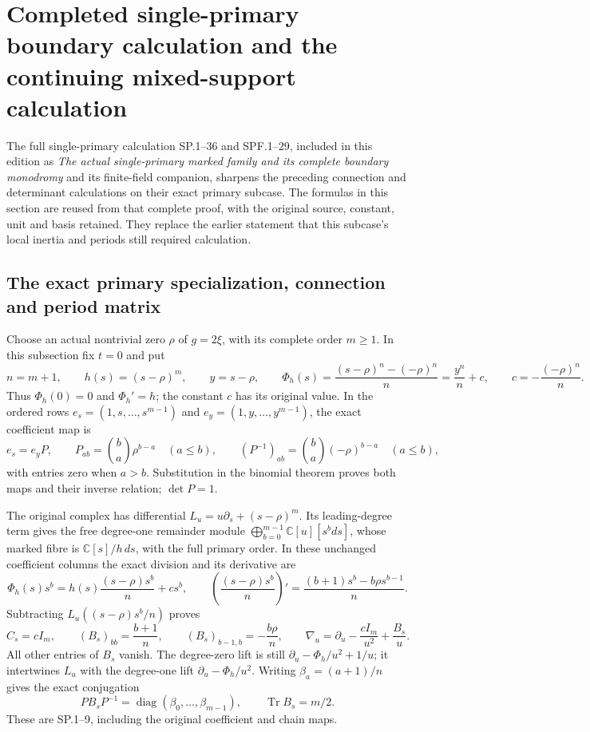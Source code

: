 \section{Completed single-primary boundary calculation and the continuing mixed-support calculation}
\label{sec:bc-single-primary-update}

The full single-primary calculation SP.1--36 and SPF.1--29,
included in this edition as
\emph{The actual single-primary marked family and its complete boundary
monodromy} and its finite-field companion, sharpens the preceding
connection and determinant calculations on their exact primary
subcase.  The formulas in this section are reused from that complete
proof, with the original source, constant, unit and basis retained.
They replace the earlier statement that this subcase's local inertia
and periods still required calculation.

\subsection{The exact primary specialization, connection and period matrix}

Choose an actual nontrivial zero \(\rho\) of \(g=2\xi\), with its
complete order \(m\geq1\).  In this subsection fix \(t=0\) and put
\[
 n=m+1,\qquad h(s)=(s-\rho)^m,\qquad
 y=s-\rho,\qquad
 \Phi_h(s)=\frac{(s-\rho)^n-(-\rho)^n}{n}
          =\frac{y^n}{n}+c,\qquad
 c=-\frac{(-\rho)^n}{n}.
\]
Thus \(\Phi_h(0)=0\) and \(\Phi_h'=h\); the constant \(c\) has its
original value.  In the ordered rows
\(e_s=(1,s,\ldots,s^{m-1})\) and
\(e_y=(1,y,\ldots,y^{m-1})\), the exact coefficient map is
\[
 e_s=e_yP,\qquad
 P_{ab}=\binom ba\rho^{b-a}\quad(a\leq b),\qquad
 (P^{-1})_{ab}=\binom ba(-\rho)^{b-a}\quad(a\leq b),
\]
with entries zero when \(a>b\).  Substitution in the binomial theorem
proves both maps and their inverse relation; \(\det P=1\).

The original complex has differential
\(L_u=u\partial_s+(s-\rho)^m\).
Its leading-degree term gives the free degree-one remainder module
\(\bigoplus_{b=0}^{m-1}\mathbb C[u][s^bds]\), whose marked fibre is
\(\mathbb C[s]/h\,ds\), with the full primary order.  In these unchanged
coefficient columns the exact division and its derivative are
\[
 \Phi_h(s)s^b
   =h(s)\frac{(s-\rho)s^b}{n}+cs^b,\qquad
 \left(\frac{(s-\rho)s^b}{n}\right)'
   =\frac{(b+1)s^b-b\rho s^{b-1}}n .
\]
Subtracting \(L_u((s-\rho)s^b/n)\) proves
\[
 C_s=cI_m,\qquad
 (B_s)_{bb}=\frac{b+1}{n},\qquad
 (B_s)_{b-1,b}=-\frac{b\rho}{n},\qquad
 \nabla_u=\partial_u-\frac{cI_m}{u^2}+\frac{B_s}{u}.
\]
All other entries of \(B_s\) vanish.  The degree-zero lift is still
\(\partial_u-\Phi_h/u^2+1/u\); it intertwines \(L_u\) with the
degree-one lift \(\partial_u-\Phi_h/u^2\).  Writing
\(\beta_a=(a+1)/n\) gives the exact conjugation
\[
 PB_sP^{-1}=\operatorname{diag}(\beta_0,\ldots,\beta_{m-1}),
 \qquad \operatorname{Tr}B_s=m/2.
\]
These are SP.1--9, including the original coefficient and chain maps.

